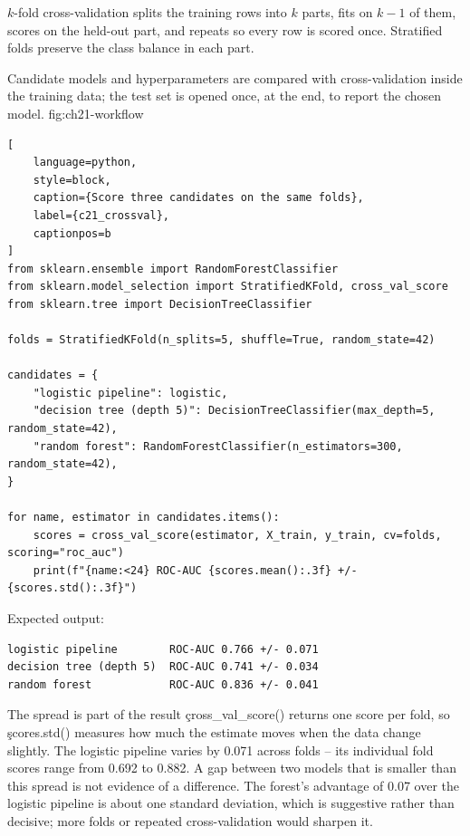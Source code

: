 $k$-fold cross-validation splits the training rows into $k$ parts, fits on
$k-1$ of them, scores on the held-out part, and repeats so every row is scored
once. Stratified folds preserve the class balance in each part.

{Candidate models and hyperparameters are compared with cross-validation inside the training data; the test set is opened once, at the end, to report the chosen model.}
{fig:ch21-workflow}

\begin{lstlisting}[
    language=python,
    style=block,
    caption={Score three candidates on the same folds},
    label={c21_crossval},
    captionpos=b
]
from sklearn.ensemble import RandomForestClassifier
from sklearn.model_selection import StratifiedKFold, cross_val_score
from sklearn.tree import DecisionTreeClassifier

folds = StratifiedKFold(n_splits=5, shuffle=True, random_state=42)

candidates = {
    "logistic pipeline": logistic,
    "decision tree (depth 5)": DecisionTreeClassifier(max_depth=5, random_state=42),
    "random forest": RandomForestClassifier(n_estimators=300, random_state=42),
}

for name, estimator in candidates.items():
    scores = cross_val_score(estimator, X_train, y_train, cv=folds, scoring="roc_auc")
    print(f"{name:<24} ROC-AUC {scores.mean():.3f} +/- {scores.std():.3f}")
\end{lstlisting}

Expected output:

\begin{lstlisting}[language=text, style=block, caption={Cross-validated comparison on training data only}, label={c21_crossval_output}, captionpos=b]
logistic pipeline        ROC-AUC 0.766 +/- 0.071
decision tree (depth 5)  ROC-AUC 0.741 +/- 0.034
random forest            ROC-AUC 0.836 +/- 0.041
\end{lstlisting}

\begin{SyntaxBox}{The spread is part of the result}
\c{cross_val_score()} returns one score per fold, so \c{scores.std()} measures how
much the estimate moves when the data change slightly. The logistic pipeline
varies by 0.071 across folds -- its individual fold scores range from 0.692 to
0.882. A gap between two models that is smaller than this spread is not evidence
of a difference. The forest's advantage of 0.07 over the logistic pipeline is
about one standard deviation, which is suggestive rather than decisive; more
folds or repeated cross-validation would sharpen it.
\end{SyntaxBox}

